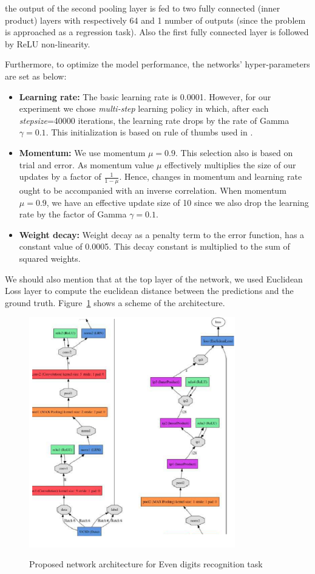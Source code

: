 \noindent the output of the second pooling layer is fed to two fully connected (inner product) layers with respectively 64 and 1 number of outputs (since the problem is approached as a regression task). Also the first fully connected layer is followed by ReLU non-linearity. 

Furthermore, to optimize the model performance, the networks' hyper-parameters are set as below:
\begin{itemize}
\item \textbf{Learning rate:} The basic learning rate is 0.0001. However, for our experiment we chose \textit{multi-step} learning policy in which, after each \textit{stepsize}=40000 iterations, the learning rate drops by the rate of Gamma $\gamma = 0.1$. This initialization is based on rule of thumbs used in \cite{krizhevsky2012imagenet}.
\item \textbf{Momentum:} We use momentum $\mu = 0.9$. This selection also is based on trial and error. As momentum value $\mu$ effectively multiplies the size of our updates by a factor of $\frac{1}{1-\mu}$. Hence, changes in momentum and learning rate ought to be accompanied with an inverse correlation. When momentum $\mu = 0.9$, we have an effective update size of 10 since we also drop the learning rate by the factor of Gamma $\gamma= 0.1$.
\item \textbf{Weight decay:} Weight decay as a penalty term to the error function, has a constant value of 0.0005. This decay constant is multiplied to the sum of squared weights.
\end{itemize}

\noindent We should also mention that at the top layer of the network, we used Euclidean Loss layer to compute the euclidean distance between the predictions and the ground truth.  Figure~\ref{fig:l2cNet} shows a scheme of the architecture.
\begin{figure}[H]
  \centering
   {\includegraphics[width=0.8\textwidth]{images/model2}}
	\caption{Proposed network architecture for Even digits recognition task}
	\label{fig:l2cNet}
\end{figure}

